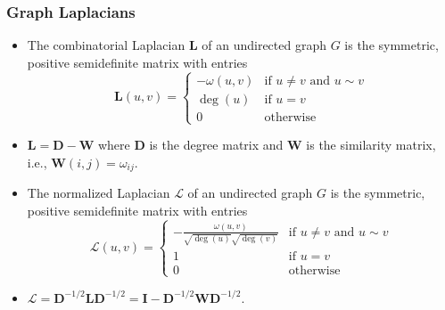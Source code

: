 \documentclass[professionalfonts,hyperref={colorlinks=true,linkcolor=red}]{beamer}
\begin{document}
\begin{frame}[label=laplacians]
  \frametitle{Graph Laplacians}
  \begin{itemize}
  \item The \alert{combinatorial Laplacian} $\bm{L}$ of an undirected graph
    $G$ is the symmetric, positive semidefinite matrix with entries
    \begin{equation}
      \label{eq:33}
      \bm{L}(u,v) = \begin{cases}
        - \omega(u,v) & \text{if $u \not = v$ and $u \sim v$} \\
        \deg(u) & \text{if $u = v$} \\
        0 & \text{otherwise}
      \end{cases}
    \end{equation}
  \item $\bm{L} = \bm{D} - \bm{W}$ where $\bm{D}$ is the degree matrix
    and $\bm{W}$ is the similarity matrix, i.e., $\bm{W}(i,j) =
    \omega_{ij}$. 
  \item The \alert{normalized Laplacian} $\bm{\mathcal{L}}$ of an
    undirected graph $G$ is the symmetric, positive semidefinite
    matrix with entries
    \begin{equation}
      \bm{\mathcal{L}}(u,v) = \begin{cases}
        - \tfrac{\omega(u,v)}{\sqrt{\deg(u)}\sqrt{\deg(v)}} & 
        \text{if $u \not = v$ and $u \sim v$} \\
        1 & \text{if $u = v$} \\
        0 & \text{otherwise}
      \end{cases}
    \end{equation}
  \item $\bm{\mathcal{L}} = \bm{D}^{-1/2} \bm{L} \bm{D}^{-1/2} = \bm{I} -
    \bm{D}^{-1/2}\bm{W}\bm{D}^{-1/2}$.  
  \end{itemize}
\end{frame}
\end{document}
